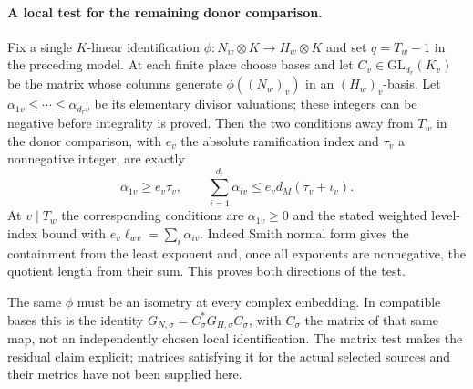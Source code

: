 \paragraph{A local test for the remaining donor comparison.}
%
Fix a single \(K\)-linear identification
\(\phi:N_w\otimes K\longrightarrow H_w\otimes K\) and set
\(q=T_w-1\) in the preceding model. At each finite place choose
bases and let \(C_v\in\mathrm{GL}_{d_r}(K_v)\) be the matrix
whose columns generate \(\phi((N_w)_v)\) in an \((H_w)_v\)-basis.
Let \(\alpha_{1v}\le\cdots\le\alpha_{d_rv}\) be its elementary
divisor valuations; these integers can be negative before
integrality is proved. Then the two conditions away from \(T_w\)
in the donor comparison, with \(e_v\) the absolute ramification
index and \(\tau_v\) a nonnegative integer, are exactly
\begin{equation}
\label{eq:ramified-donor-matrix-test}
 \alpha_{1v}\ge e_v\tau_v,\qquad
 \sum_{i=1}^{d_r}\alpha_{iv}
       \le e_v d_M(\tau_v+\iota_v).
\end{equation}
At \(v\mid T_w\) the corresponding conditions are
\(\alpha_{1v}\ge0\) and the stated weighted level-index bound
with \(e_v\ell_{wv}=\sum_i\alpha_{iv}\). Indeed Smith normal
form gives the containment from the least exponent and, once
all exponents are nonnegative, the quotient length from their
sum. This proves both directions of the test.

The same \(\phi\) must be an isometry at every complex embedding.
In compatible bases this is the identity
\(G_{N,\sigma}=C_\sigma^*G_{H,\sigma}C_\sigma\), with
\(C_\sigma\) the matrix of that same map, not an independently
chosen local identification. The matrix test makes the residual
claim explicit; matrices satisfying it for the actual selected
sources and their metrics have not been supplied here.
